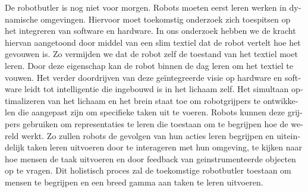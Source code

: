 \documentclass[\home/main.tex]{subfiles}
\begin{document}
\begin{otherlanguage}{dutch}
De robotbutler is nog niet voor morgen. Robots moeten eerst leren werken in dynamische omgevingen. Hiervoor moet toekomstig onderzoek zich toespitsen op het integreren van software en hardware. In ons onderzoek hebben we de kracht hiervan aangetoond door middel van een slim textiel dat de robot vertelt hoe het gevouwen is. Zo vermijden we dat de robot zelf de toestand van het textiel moet leren. Door deze eigenschap kan de robot binnen de dag leren om het textiel te vouwen.
Het verder doordrijven van deze geïntegreerde visie op hardware en software leidt tot intelligentie die ingebouwd is in het lichaam zelf. Het simultaan optimalizeren van het lichaam en het brein staat toe om robotgrijpers te ontwikkelen die aangepast zijn om specifieke taken uit te voeren. Robots kunnen deze grijpers gebruiken om representaties te leren die toestaan om te begrijpen hoe de wereld werkt. Zo zullen robots de gevolgen van hun acties leren begrijpen en uiteindelijk taken leren uitvoeren door te interageren met hun omgeving, te kijken naar hoe mensen de taak uitvoeren en door feedback van geinstrumenteerde objecten op te vragen. 
Dit holistisch proces zal de toekomstige robotbutler toestaan om mensen te begrijpen en een breed gamma aan taken te leren uitvoeren. 

\end{otherlanguage}
\end{document}
